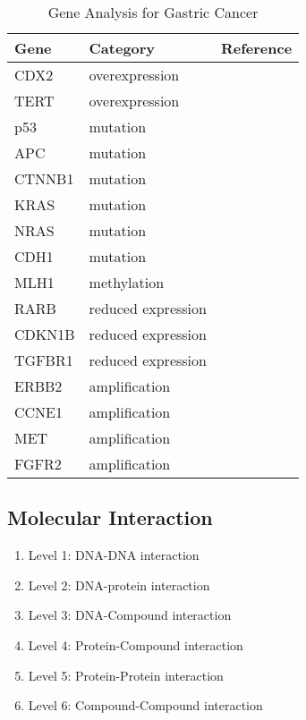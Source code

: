 \begin{table}[H]
\caption{Gene Analysis for Gastric Cancer}	
\begin{tabular}{p{2cm}p{3cm}p{1cm}}
\hline	
Gene & Category & Reference \\ 
\hline
CDX2 & overexpression & \cite{key400} \\
TERT & overexpression & \cite{key400}  \\
\hline
p53 & mutation &  \cite{key400} \\
APC &  mutation &  \cite{key400} \\
CTNNB1 & mutation &  \cite{key400} \\
KRAS & mutation &  \cite{key400}  \\
NRAS & mutation &  \cite{key400} \\
CDH1 & mutation &  \cite{key400} \\
\hline
MLH1 & methylation & \cite{key400}  \\
\hline
RARB & reduced expression &  \cite{key400}  \\
CDKN1B & reduced expression & \cite{key400} \\
TGFBR1 & reduced expression &  \cite{key400} \\
\hline
ERBB2 & amplification & \cite{key400}  \\
CCNE1 & amplification &  \cite{key400} \\
MET & amplification &  \cite{key400} \\
FGFR2 & amplification & \cite{key400} \\
\hline 
\end{tabular}
\end{table}



\subsection{Molecular Interaction}

\begin{enumerate}
	\item Level 1: DNA-DNA interaction 
	\item Level 2: DNA-protein interaction
	\item Level 3: DNA-Compound interaction
	\item Level 4: Protein-Compound interaction 
	\item Level 5: Protein-Protein interaction 
	\item Level 6: Compound-Compound interaction 
\end{enumerate}

